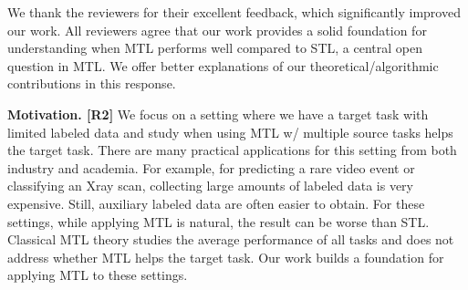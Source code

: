 \documentclass{article}
\begin{document}
We thank the reviewers for their excellent feedback, which significantly improved our work.
All reviewers agree that our work provides a solid foundation for understanding when MTL performs well compared to STL, a central open question in MTL.
We offer better explanations of our theoretical/algorithmic contributions in this response.


\textbf{Motivation. [R2]}
We focus on a setting where we have a target task with limited labeled data and study when using MTL w/ multiple source tasks helps the target task. %
There are many practical applications for this setting from both industry and academia.
For example, for predicting a rare video event or classifying an Xray scan, collecting large amounts of labeled data is very expensive.
Still, auxiliary labeled data are often easier to obtain.
For these settings, while applying MTL is natural, the result can be worse than STL.
Classical MTL theory studies the average performance of all tasks and does not address whether MTL helps the target task.
Our work builds a foundation for applying MTL to these settings.
\end{document}
